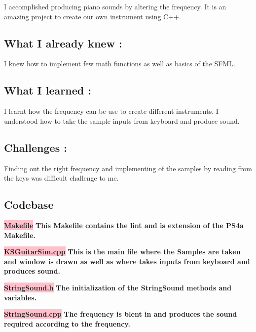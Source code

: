 I accomplished producing piano sounds by altering the frequency. It is an amazing project to create our own instrument using C++.

\subsection{What I already knew :}

I knew how to implement few math functions as well as basics of the SFML.

\subsection{What I learned :}
I learnt how the frequency can be use to create different instruments. I understood how to take the sample inputs from keyboard and produce sound.
\subsection{Challenges :}
Finding out the right frequency and implementing of the samples by reading from the keys was difficult challenge to me.

\subsection{Codebase}\label{sec:ps4b:code}

\textbf{\colorbox{pink}{Makefile}} \newline \textbf{This Makefile contains the lint and is extension of the PS4a Makefile.}



\textbf{\colorbox{pink}{KSGuitarSim.cpp}} \newline \textbf{This is the main file where the Samples are taken and window is drawn as well as where takes inputs from keyboard and produces sound.}


\newpage
\textbf{\colorbox{pink}{StringSound.h}} \newline \textbf{The initialization of the StringSound methods and variables.}


\textbf{\colorbox{pink}{StringSound.cpp}} \newline \textbf{The frequency is blent in and produces the sound required according to the frequency.}



